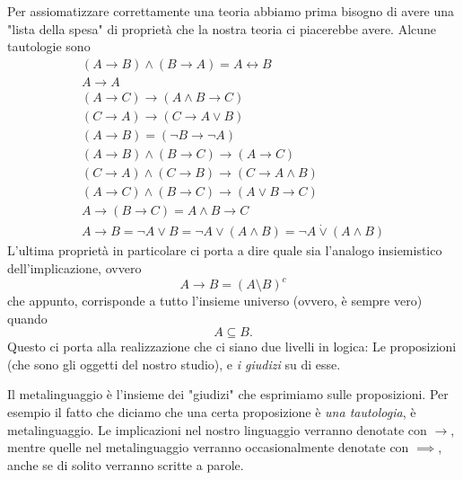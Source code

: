 \documentclass[11pt]{scrartcl}
\begin{document}
	Per assiomatizzare correttamente una teoria abbiamo prima bisogno di avere una "lista della spesa" di proprietà che la nostra teoria ci piacerebbe avere. Alcune tautologie sono
	\begin{gather}
		(A\to B) \land (B\to A) = A\leftrightarrow B \\
		A\to A \\
		\left(A\to C\right)\to \left(A\land B \to C\right) \\
		\left(C\to A\right) \to (C \to A\lor B) \\
		\left(A\to B\right) = \left(\lnot B \to \lnot A\right) \\
		\left(A \to B\right)\land \left(B\to C\right) \to \left(A\to C\right) \\
		\left(C\to A\right)\land \left(C\to B\right) \to \left(C\to A\land B\right) \\
		\left(A\to C\right)\land \left(B\to C\right)\to \left(A\lor B \to C\right) \\
		A \to \left(B\to C\right) = A\land B \to C \\
		A\to B = \lnot A \lor B =\lnot A \lor \left(A\land B\right)=\lnot A \dot{\lor} \left(A\land B\right)
	\end{gather}
	L'ultima proprietà in particolare ci porta a dire quale sia l'analogo insiemistico dell'implicazione, ovvero
	$$A\to B = (A\setminus B)^c$$
	che appunto, corrisponde a tutto l'insieme universo (ovvero, è sempre vero) quando $$A\subseteq B.$$
	Questo ci porta alla realizzazione che ci siano due livelli in logica: Le proposizioni (che sono gli oggetti del nostro studio), e \textit{i giudizi} su di esse. 
	\begin{definition}[Metalinguaggio]
		Il metalinguaggio è l'insieme dei "giudizi" che esprimiamo sulle proposizioni. Per esempio il fatto che diciamo che una certa proposizione è \textit{una tautologia}, è metalinguaggio. Le implicazioni nel nostro linguaggio verranno denotate con $\to$, mentre quelle nel metalinguaggio verranno occasionalmente denotate con $\implies$, anche se di solito verranno scritte a parole.
	\end{definition}
\end{document}
